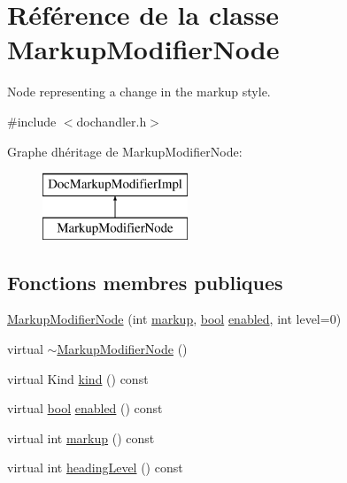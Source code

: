 \hypertarget{class_markup_modifier_node}{}\section{Référence de la classe Markup\+Modifier\+Node}
\label{class_markup_modifier_node}


Node representing a change in the markup style.  




{\ttfamily \#include $<$dochandler.\+h$>$}

Graphe d\textquotesingle{}héritage de Markup\+Modifier\+Node\+:\begin{figure}[H]
\begin{center}
\leavevmode
\includegraphics[height=2.000000cm]{class_markup_modifier_node}
\end{center}
\end{figure}
\subsection*{Fonctions membres publiques}
\begin{DoxyCompactItemize}
\item 
\hyperlink{class_markup_modifier_node_a2e4736718c7f7342818ba8b027ebe74c}{Markup\+Modifier\+Node} (int \hyperlink{class_markup_modifier_node_a1c0171d9cc33f8877579685ec60ccde1}{markup}, \hyperlink{qglobal_8h_a1062901a7428fdd9c7f180f5e01ea056}{bool} \hyperlink{class_markup_modifier_node_a0463600dd5a1d3fc917e6ff6365c688f}{enabled}, int level=0)
\item 
virtual \hyperlink{class_markup_modifier_node_a125c8d9f3f50102126f6eeed8ef15e67}{$\sim$\+Markup\+Modifier\+Node} ()
\item 
virtual Kind \hyperlink{class_markup_modifier_node_a8727e5dd6207ef42d37ce0f34f0bb4cc}{kind} () const 
\item 
virtual \hyperlink{qglobal_8h_a1062901a7428fdd9c7f180f5e01ea056}{bool} \hyperlink{class_markup_modifier_node_a0463600dd5a1d3fc917e6ff6365c688f}{enabled} () const 
\item 
virtual int \hyperlink{class_markup_modifier_node_a1c0171d9cc33f8877579685ec60ccde1}{markup} () const 
\item 
virtual int \hyperlink{class_markup_modifier_node_a2064d826e948934a04312f87620ff71c}{heading\+Level} () const 
\end{DoxyCompactItemize}


